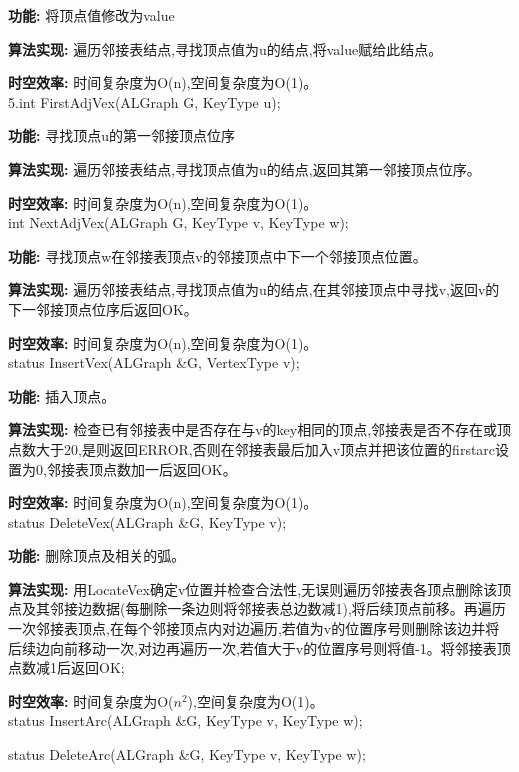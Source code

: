 \documentclass[supercite]{Experimental_Report}
\theoremstyle{definition}
\begin{document}
\textbf{功能: }将顶点值修改为value

\textbf{算法实现: }遍历邻接表结点,寻找顶点值为u的结点,将value赋给此结点。

\textbf{时空效率: }时间复杂度为O(n),空间复杂度为O(1)。\\

5.int FirstAdjVex(ALGraph G, KeyType u);

\textbf{功能: }寻找顶点u的第一邻接顶点位序

\textbf{算法实现: }遍历邻接表结点,寻找顶点值为u的结点,返回其第一邻接顶点位序。

\textbf{时空效率: }时间复杂度为O(n),空间复杂度为O(1)。\\

int NextAdjVex(ALGraph G, KeyType v, KeyType w);

\textbf{功能: }寻找顶点w在邻接表顶点v的邻接顶点中下一个邻接顶点位置。

\textbf{算法实现: }遍历邻接表结点,寻找顶点值为u的结点,在其邻接顶点中寻找v,返回v的下一邻接顶点位序后返回OK。

\textbf{时空效率: }时间复杂度为O(n),空间复杂度为O(1)。\\

status InsertVex(ALGraph \&G, VertexType v);

\textbf{功能: }插入顶点。

\textbf{算法实现: }检查已有邻接表中是否存在与v的key相同的顶点,邻接表是否不存在或顶点数大于20,是则返回ERROR,否则在邻接表最后加入v顶点并把该位置的firstarc设置为0,邻接表顶点数加一后返回OK。

\textbf{时空效率: }时间复杂度为O(n),空间复杂度为O(1)。\\

status DeleteVex(ALGraph \&G, KeyType v);

\textbf{功能: }删除顶点及相关的弧。

\textbf{算法实现: }用LocateVex确定v位置并检查合法性,无误则遍历邻接表各顶点删除该顶点及其邻接边数据(每删除一条边则将邻接表总边数减1),将后续顶点前移。再遍历一次邻接表顶点,在每个邻接顶点内对边遍历,若值为v的位置序号则删除该边并将后续边向前移动一次,对边再遍历一次,若值大于v的位置序号则将值-1。将邻接表顶点数减1后返回OK;

\textbf{时空效率: }时间复杂度为O($n^{2}$),空间复杂度为O(1)。\\

status InsertArc(ALGraph \&G, KeyType v, KeyType w);

status DeleteArc(ALGraph \&G, KeyType v, KeyType w);
\end{document}
